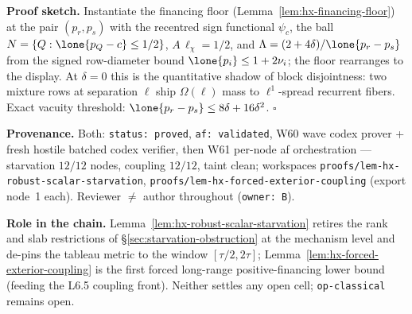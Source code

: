 \noindent\textbf{Proof sketch.} Instantiate the financing floor
(Lemma~\ref{lem:hx-financing-floor}) at the pair $(p_r,p_s)$ with the recentred sign
functional $\psi_c$, the ball $N=\{Q:\lone{p_Q-c}\le1/2\}$, $A\,\ell_\chi=1/2$, and
$\Lambda=(2+4\delta)/\lone{p_r-p_s}$ from the signed row-diameter bound
$\lone{p_i}\le1+2\nu_i$; the floor rearranges to the display. At $\delta=0$ this is
the quantitative shadow of block disjointness: two mixture rows at separation
$\ell$ ship $\Omega(\ell)$ mass to $\ell^1$-spread recurrent fibers. Exact vacuity
threshold: $\lone{p_r-p_s}\le8\delta+16\delta^2$. \hfill$\square$

\noindent\textbf{Provenance.} Both: \texttt{status: proved},
\texttt{af: validated}, W60 wave codex prover + fresh hostile batched codex
verifier, then W61 per-node af orchestration --- starvation $12/12$ nodes, coupling
$12/12$, taint clean; workspaces
\texttt{proofs/lem-hx-robust-scalar-starvation},
\texttt{proofs/lem-hx-forced-exterior-coupling} (export node~1 each). Reviewer
$\neq$ author throughout (\texttt{owner: B}).

\noindent\textbf{Role in the chain.} Lemma~\ref{lem:hx-robust-scalar-starvation}
retires the rank and slab restrictions of \S\ref{sec:starvation-obstruction} at the
mechanism level and de-pins the tableau metric to the window $[\tau/2,2\tau]$;
Lemma~\ref{lem:hx-forced-exterior-coupling} is the first forced long-range
positive-financing lower bound (feeding the L6.5 coupling front). Neither settles
any open cell; \texttt{op-classical} remains open.
